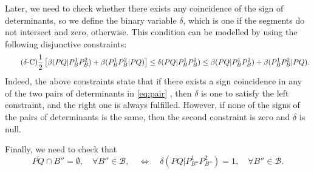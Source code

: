 \documentclass[a4paper,  review, authoryear, 1p.]{elsarticle}
\newcommand{\B}{{\mathcal B}}
\newcommand{\ES}{{E^{}_{S}}}
\newcommand{\segment}[2]{\overline{#1#2}}
\newcommand{\determinant}[3]{\det({#1|#2#3})}
\begin{document}
	\newcommand{\deltacheck}[4]{\delta(#1#2|#3#4)}
	
	Later, we need to check whether there exists any coincidence of the sign of determinants, so we define the binary variable $\delta$, which is one if the segments do not intersect and zero, otherwise. This condition can be modelled by using the following disjunctive constraints:
	\begin{equation*}\tag{$\delta$-C}\label{eq:deltaC}
		\frac{1}{2}\left[\betamas{P}{Q}{P_B^1}{P_B^2}+\betamas{P_B^1}{P_B^2}{P}{Q}\right]\leq\deltacheck{P}{Q}{P_B^1}{P_B^2}\leq \betamas{P}{Q}{P_B^1}{P_B^2}+\betamas{P_B^1}{P_B^2}{P}{Q}.
	\end{equation*}
	Indeed, the above constraints state that if there exists a sign coincidence in any of the two pairs of determinants in \eqref{eq:pair} , then $\delta$ is one to satisfy the left constraint, and the right one is always fulfilled. However, if none of the signs of the pairs of determinants is the same, then the second constraint is zero and $\delta$ is null.
	
	Finally, we need to check that
	$$\overline{PQ}\cap B''=\emptyset,\quad \forall B''\in\B,\quad\Longleftrightarrow\quad \deltacheck{P}{Q}{P_{B''}^1}{P_{B''}^2}=1,\quad\forall B''\in\B.$$
	
	
	\newcommand{\varepsilonvar}[2]{\varepsilon(#1#2)}
	
\end{document}
